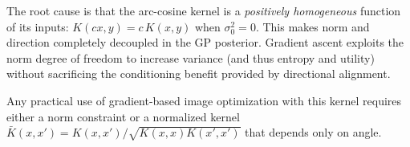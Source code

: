 \documentclass[11pt]{article}
\begin{document}
The root cause is that the arc-cosine kernel is a \emph{positively homogeneous}
function of its inputs: $K(cx, y) = c \, K(x, y)$ when $\sigma_0^2 = 0$.
This makes norm and direction completely decoupled in the GP posterior.
Gradient ascent exploits the norm degree of freedom to increase variance
(and thus entropy and utility) without sacrificing the conditioning
benefit provided by directional alignment.

Any practical use of gradient-based image optimization with this kernel
requires either a norm constraint or a normalized kernel
$\bar{K}(x,x') = K(x,x')/\sqrt{K(x,x) K(x',x')}$ that depends only on angle.
\end{document}
